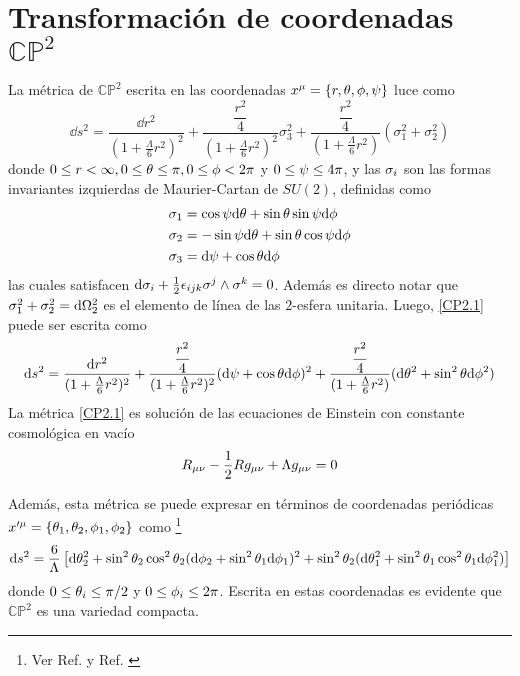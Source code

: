 \section{Transformación de coordenadas $\mathbb{CP}^2$}
La métrica de $\mathbb{CP}^2$ escrita en las coordenadas $x^\mu=\{r,\theta,\phi,\psi\}$ luce como
\begin{equation}\label{CP2.1}
  \dd s^2=\frac{\dd r^2}{(1+\frac{\Lambda}{6}r^2)^2}+\frac{\dfrac{r^2}{4}}{(1+\frac{\Lambda}{6}r^2)^2}\sigma_3^2+\frac{\dfrac{r^2}{4}}{(1+\frac{\Lambda}{6}r^2)}(\sigma_1^2+\sigma_2^2)
\end{equation}
donde $0\leq r<\infty,0\leq\theta\leq\pi ,0\leq \phi<2\pi $ y $0\leq\psi\leq 4\pi $, y las $\sigma_i$ son las formas invariantes izquierdas de Maurier-Cartan de $SU(2)$, definidas como
\begin{align}
  \sigma_1&=\cos\psi\dd\theta+\sin\theta\sin\psi \dd\phi\\
  \sigma_2&=-\sin\psi\dd\theta+\sin\theta\cos\psi \dd\phi \\
  \sigma_3&=\dd\psi+\cos\theta\dd\phi 
\end{align}
las cuales satisfacen $\dd\sigma_i+\frac{1}{2}\epsilon_{ijk}\sigma^{j}\wedge\sigma^k=0$. Además es directo notar que $\sigma_1^2+\sigma_2^2=\dd\Omega_2^2$ es el elemento de línea de las $2$-esfera unitaria. Luego, \eqref{CP2.1} puede ser escrita como
\begin{equation}\label{CP2-r}
  \dd s^2=\frac{\dd r^2}{(1+\frac{\Lambda}{6}r^2)^2}+\frac{\dfrac{r^2}{4}}{(1+\frac{\Lambda}{6}r^2)^2}(\dd\psi+\cos\theta\dd\phi )^2+\frac{\dfrac{r^2}{4}}{(1+\frac{\Lambda}{6}r^2)}(\dd\theta^2+\sin^2\theta\dd\phi^2)
\end{equation}
La métrica \eqref{CP2.1} es solución de las ecuaciones de Einstein con constante cosmológica en vacío
\begin{equation}
  R_{\mu\nu}-\frac{1}{2}Rg_{\mu\nu}+\Lambda g_{\mu\nu}=0
\end{equation}


Además,  esta métrica se puede expresar en términos de coordenadas periódicas $x'^\mu=\{\theta_1,\theta_2,\phi_1,\phi_2\}$ como \footnote{Ver Ref. \cite{PhysRevD.106.084055} y Ref. \cite{Hoxha:2000jf}}
\begin{equation}\label{CP2-angle}
  \dd s^2=\frac{6}{\Lambda}\left[\dd\theta_2^2+\sin^2\theta_2\cos^2\theta_2(\dd\phi_2+\sin^2\theta_1\dd\phi_1)^2+\sin^2\theta_2(\dd\theta_1^2+\sin^2\theta_1\cos^2\theta_1\dd\phi_1^2)\right]
\end{equation}
donde $0\leq\theta_i\leq\pi/2$ y $0\leq\phi_i\leq 2\pi $. Escrita en estas coordenadas es evidente que $\mathbb{CP}^2$ es una variedad compacta.

